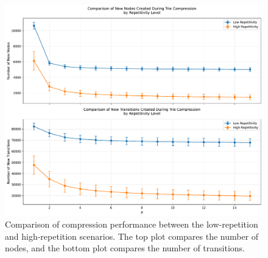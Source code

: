 \begin{figure}[H]
    \centering
    \includegraphics[width=1\linewidth]{Immagini/high_low_comparison.pdf}
    \caption{Comparison of compression performance between the low-repetition and high-repetition scenarios. The top plot compares the number of nodes, and the bottom plot compares the number of transitions.}
    \label{fig:exp_comparison}
\end{figure}